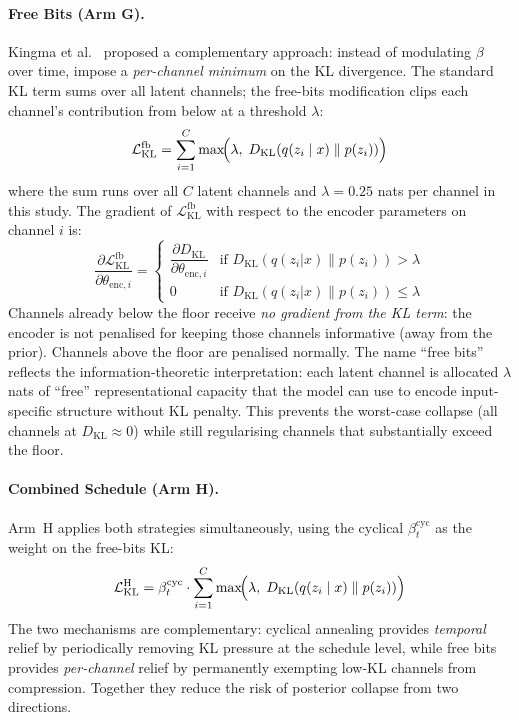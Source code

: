 \documentclass[12pt, a4paper, twoside, openright]{book}
\begin{document}
\paragraph{Free Bits (Arm G).}
Kingma et al.~\cite{kingma_improving_2016} proposed a complementary approach: instead of modulating $\beta$ over time, impose a \emph{per-channel minimum} on the KL divergence. The standard KL term sums over all latent channels; the free-bits modification clips each channel's contribution from below at a threshold $\lambda$:
\begin{equation}
\label{eq:methods:kl:freebits}
\mathcal{L}_{\mathrm{KL}}^{\mathrm{fb}} = \sum_{i=1}^{C}
  \max\!\Bigl(\lambda,\; D_{\mathrm{KL}}\!\left(q(z_i \mid x)\;\|\;p(z_i)\right)\Bigr)
\end{equation}
where the sum runs over all $C$ latent channels and $\lambda = 0.25$ nats per channel in this study. The gradient of $\mathcal{L}_{\mathrm{KL}}^{\mathrm{fb}}$ with respect to the encoder parameters on channel $i$ is:
\[
  \frac{\partial \mathcal{L}_{\mathrm{KL}}^{\mathrm{fb}}}{\partial \theta_{\mathrm{enc},i}}
  = \begin{cases}
      \dfrac{\partial D_{\mathrm{KL}}}{\partial \theta_{\mathrm{enc},i}} & \text{if } D_{\mathrm{KL}}(q(z_i|x)\|p(z_i)) > \lambda \\[6pt]
      0 & \text{if } D_{\mathrm{KL}}(q(z_i|x)\|p(z_i)) \leq \lambda
    \end{cases}
\]
Channels already below the floor receive \emph{no gradient from the KL term}: the encoder is not penalised for keeping those channels informative (away from the prior). Channels above the floor are penalised normally. The name ``free bits'' reflects the information-theoretic interpretation: each latent channel is allocated $\lambda$ nats of ``free'' representational capacity that the model can use to encode input-specific structure without KL penalty. This prevents the worst-case collapse (all channels at $D_{\mathrm{KL}} \approx 0$) while still regularising channels that substantially exceed the floor.

\paragraph{Combined Schedule (Arm H).}
Arm~H applies both strategies simultaneously, using the cyclical $\beta_t^{\mathrm{cyc}}$ as the weight on the free-bits KL:
\begin{equation}
\label{eq:methods:kl:combined}
\mathcal{L}_{\mathrm{KL}}^{\mathrm{H}} = \beta_t^{\mathrm{cyc}} \cdot
  \sum_{i=1}^{C} \max\!\Bigl(\lambda,\; D_{\mathrm{KL}}\!\left(q(z_i \mid x)\;\|\;p(z_i)\right)\Bigr)
\end{equation}
The two mechanisms are complementary: cyclical annealing provides \emph{temporal} relief by periodically removing KL pressure at the schedule level, while free bits provides \emph{per-channel} relief by permanently exempting low-KL channels from compression. Together they reduce the risk of posterior collapse from two directions.
\end{document}
